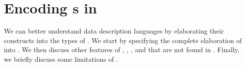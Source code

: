 \section{Encoding \ddl{}s in \ddc{}}
\label{sec:ddc-encodings}


We can better understand data description languages by elaborating
their constructs into the types of \ddc{}. We start by specifying the
complete elaboration of \ipads{}
into \ddc. We then discuss other features of \padsc{}, \padsml{},
\datascript{}, and \packettypes{} that are not found in \ipads{}.
Finally, we briefly discuss some limitations of \ddc{}.




